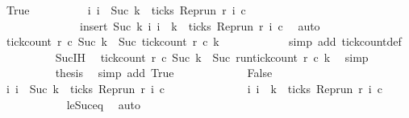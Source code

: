 \begin{isabellebody}
\ True\isanewline
\ \ \ \ \ \ \ \ \isamarkupfalse%
\ {\isacartoucheopen}{\isacharbraceleft}i{\isachardot}\ i\ {\isasymle}\ Suc\ k\ {\isasymand}\ ticks\ {\isacharparenleft}{\isacharparenleft}Rep{\isacharunderscore}run\ r{\isacharparenright}\ i\ c{\isacharparenright}{\isacharbraceright}\isanewline
\ \ \ \ \ \ \ \ \ \ \ \ \ {\isacharequal}\ insert\ {\isacharparenleft}Suc\ k{\isacharparenright}\ {\isacharbraceleft}i{\isachardot}\ i\ {\isasymle}\ k\ {\isasymand}\ ticks\ {\isacharparenleft}{\isacharparenleft}Rep{\isacharunderscore}run\ r{\isacharparenright}\ i\ c{\isacharparenright}{\isacharbraceright}{\isacartoucheclose}\ \isamarkupfalse%
\ auto\isanewline
\ \ \ \ \ \ \ \ \isamarkupfalse%
\ {\isacartoucheopen}tick{\isacharunderscore}count\ r\ c\ {\isacharparenleft}Suc\ k{\isacharparenright}\ {\isacharequal}\ Suc\ {\isacharparenleft}tick{\isacharunderscore}count\ r\ c\ k{\isacharparenright}{\isacartoucheclose}\isanewline
\ \ \ \ \ \ \ \ \ \ \isamarkupfalse%
\ {\isacharparenleft}simp\ add{\isacharcolon}\ tick{\isacharunderscore}count{\isacharunderscore}def{\isacharparenright}\isanewline
\ \ \ \ \ \ \ \ \isamarkupfalse%
\ Suc{\isachardot}IH\ \isamarkupfalse%
\ {\isacartoucheopen}tick{\isacharunderscore}count\ r\ c\ {\isacharparenleft}Suc\ k{\isacharparenright}\ {\isacharequal}\ Suc\ {\isacharparenleft}run{\isacharunderscore}tick{\isacharunderscore}count\ r\ c\ k{\isacharparenright}{\isacartoucheclose}\ \isamarkupfalse%
\ simp\isanewline
\ \ \ \ \ \ \ \ \isamarkupfalse%
\ {\isacharquery}thesis\ \isamarkupfalse%
\ {\isacharparenleft}simp\ add{\isacharcolon}\ True{\isacharparenright}\isanewline
\ \ \ \ \isamarkupfalse%
\isanewline
\ \ \ \ \ \ \isamarkupfalse%
\ False\isanewline
\ \ \ \ \ \ \ \ \isamarkupfalse%
\ {\isacartoucheopen}{\isacharbraceleft}i{\isachardot}\ i\ {\isasymle}\ Suc\ k\ {\isasymand}\ ticks\ {\isacharparenleft}{\isacharparenleft}Rep{\isacharunderscore}run\ r{\isacharparenright}\ i\ c{\isacharparenright}{\isacharbraceright}\isanewline
\ \ \ \ \ \ \ \ \ \ \ \ \ {\isacharequal}\ {\isacharbraceleft}i{\isachardot}\ i\ {\isasymle}\ k\ {\isasymand}\ ticks\ {\isacharparenleft}{\isacharparenleft}Rep{\isacharunderscore}run\ r{\isacharparenright}\ i\ c{\isacharparenright}{\isacharbraceright}{\isacartoucheclose}\isanewline
\ \ \ \ \ \ \ \ \ \ \isamarkupfalse%
\ le{\isacharunderscore}Suc{\isacharunderscore}eq\ \isamarkupfalse%
\ auto\isanewline

\end{isabellebody}

